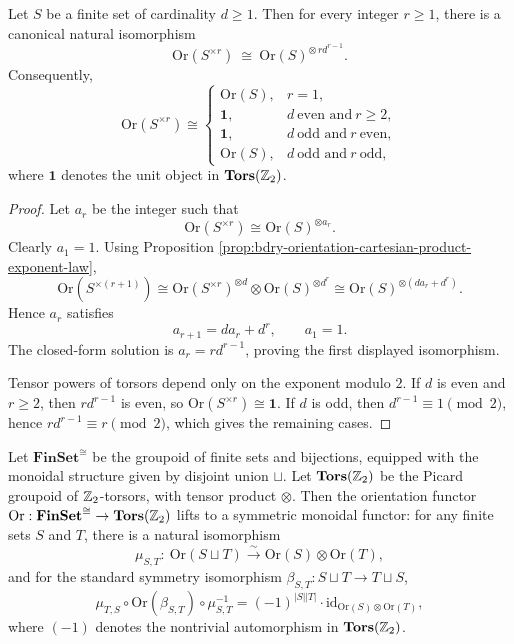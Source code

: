 \begin{theorem}\label{thm:bdry-orientation-cartesian-power-parity-collapse}
Let \(S\) be a finite set of cardinality \(d\ge 1\).
Then for every integer \(r\ge 1\), there is a canonical natural isomorphism
\[
\mathrm{Or}(S^{\times r})\ \cong\ \mathrm{Or}(S)^{\otimes\, r d^{r-1}}.
\]
Consequently,
\[
\mathrm{Or}(S^{\times r})\cong
\begin{cases}
\mathrm{Or}(S), & r=1,\\[2pt]
\mathbf 1, & d\ \text{even and}\ r\ge 2,\\[2pt]
\mathbf 1, & d\ \text{odd and}\ r\ \text{even},\\[2pt]
\mathrm{Or}(S), & d\ \text{odd and}\ r\ \text{odd},
\end{cases}
\]
where \(\mathbf 1\) denotes the unit object in \(\mathbf{Tors}(\mathbb{Z}_2)\).
\end{theorem}

\begin{proof}
Let \(a_r\) be the integer such that
\[
\mathrm{Or}(S^{\times r})\cong \mathrm{Or}(S)^{\otimes a_r}.
\]
Clearly \(a_1=1\).
Using Proposition \ref{prop:bdry-orientation-cartesian-product-exponent-law},
\[
\mathrm{Or}(S^{\times(r+1)})
\cong
\mathrm{Or}(S^{\times r})^{\otimes d}\otimes \mathrm{Or}(S)^{\otimes d^r}
\cong
\mathrm{Or}(S)^{\otimes (d a_r+d^r)}.
\]
Hence \(a_r\) satisfies
\[
a_{r+1}=d a_r+d^r,\qquad a_1=1.
\]
The closed-form solution is \(a_r=r d^{r-1}\), proving the first displayed isomorphism.
\par
Tensor powers of torsors depend only on the exponent modulo \(2\).
If \(d\) is even and \(r\ge 2\), then \(r d^{r-1}\) is even, so \(\mathrm{Or}(S^{\times r})\cong \mathbf 1\).
If \(d\) is odd, then \(d^{r-1}\equiv 1\pmod 2\), hence
\(
r d^{r-1}\equiv r\pmod 2
\),
which gives the remaining cases. \qedhere
\end{proof}

\begin{proposition}\label{prop:bdry-orientation-functor-symmetric-monoidal-koszul}
Let \(\mathbf{FinSet}^{\cong}\) be the groupoid of finite sets and bijections, equipped with the monoidal structure given by disjoint union \(\sqcup\).
Let \(\mathbf{Tors}(\mathbb{Z}_2)\) be the Picard groupoid of \(\mathbb{Z}_2\)-torsors, with tensor product \(\otimes\).
Then the orientation functor \(\mathrm{Or}:\mathbf{FinSet}^{\cong}\to \mathbf{Tors}(\mathbb{Z}_2)\) lifts to a symmetric monoidal functor: for any finite sets \(S\) and \(T\), there is a natural isomorphism
\[
\mu_{S,T}:\ \mathrm{Or}(S\sqcup T)\xrightarrow{\ \sim\ }\mathrm{Or}(S)\otimes\mathrm{Or}(T),
\]
and for the standard symmetry isomorphism \(\beta_{S,T}:S\sqcup T\to T\sqcup S\),
\[
\mu_{T,S}\circ \mathrm{Or}(\beta_{S,T})\circ \mu_{S,T}^{-1}
=(-1)^{|S||T|}\cdot\mathrm{id}_{\mathrm{Or}(S)\otimes \mathrm{Or}(T)},
\]
where \((-1)\) denotes the nontrivial automorphism in \(\mathbf{Tors}(\mathbb{Z}_2)\).
\end{proposition}

